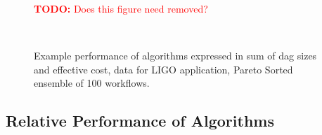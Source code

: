 \documentclass[conference]{IEEEtran}
\newcommand{\TODO}[1]{
  {\Large \textcolor{red}{\textbf{TODO: }#1}}
}
\begin{document}
\begin{figure}[htb]
    \TODO{Does this figure need removed?}
    \centering
    \\
    \caption{Example performance of algorithms expressed in
    sum of dag sizes and effective cost, data for LIGO application, Pareto
    Sorted ensemble of 100 workflows.}
    \label{fig:size-cost}
\end{figure}

\subsection{Relative Performance of Algorithms}
\end{document}
